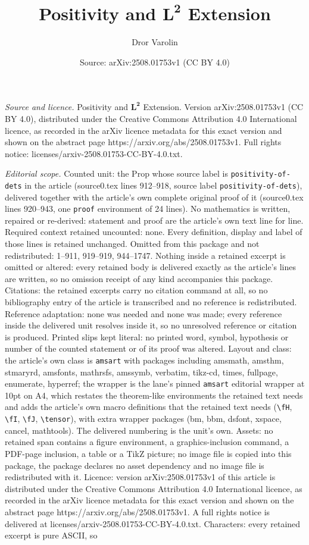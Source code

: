 \documentclass[10pt,a4paper]{amsart}
\title[Positivity and $\mathbf{L^2}$ Extension]{Positivity and $\mathbf{L^2}$ Extension}
\author{Dror Varolin}
\date{Source: arXiv:2508.01753v1 (CC BY 4.0)}
\begin{document}
\maketitle

\noindent\emph{Source and licence.} Positivity and $\mathbf{L^2}$ Extension. Version arXiv:2508.01753v1 (CC BY 4.0), distributed under the Creative Commons Attribution 4.0 International licence, as recorded in the arXiv licence metadata for this exact version and shown on the abstract page https://arxiv.org/abs/2508.01753v1. Full rights notice: licenses/arxiv-2508.01753-CC-BY-4.0.txt.\par\smallskip

\noindent\textit{Editorial scope.} Counted unit: the Prop whose source label is \texttt{positivity-of-dets} in the article (source0.tex lines 912--918, source label \texttt{positivity-of-dets}), delivered together with the article's own complete original proof of it (source0.tex lines 920--943, one \texttt{proof} environment of 24 lines). No mathematics is written, repaired or re-derived: statement and proof are the article's own text line for line. Required context retained uncounted: none. Every definition, display and label of those lines is retained unchanged. Omitted from this package and not redistributed: 1--911, 919--919, 944--1747. Nothing inside a retained excerpt is omitted or altered: every retained body is delivered exactly as the article's lines are written, so no omission receipt of any kind accompanies this package. Citations: the retained excerpts carry no citation command at all, so no bibliography entry of the article is transcribed and no reference is redistributed. Reference adaptation: none was needed and none was made; every reference inside the delivered unit resolves inside it, so no unresolved reference or citation is produced. Printed slips kept literal: no printed word, symbol, hypothesis or number of the counted statement or of its proof was altered. Layout and class: the article's own class is \texttt{amsart} with packages including amsmath, amsthm, stmaryrd, amsfonts, mathrsfs, amssymb, verbatim, tikz-cd, times, fullpage, enumerate, hyperref; the wrapper is the lane's pinned \texttt{amsart} editorial wrapper at 10pt on A4, which restates the theorem-like environments the retained text needs and adds the article's own macro definitions that the retained text needs (\texttt{\textbackslash fH}, \texttt{\textbackslash fI}, \texttt{\textbackslash fJ}, \texttt{\textbackslash tensor}), with extra wrapper packages (bm, bbm, dsfont, xspace, cancel, mathtools). The delivered numbering is the unit's own. Assets: no retained span contains a figure environment, a graphics-inclusion command, a PDF-page inclusion, a table or a TikZ picture; no image file is copied into this package, the package declares no asset dependency and no image file is redistributed with it. Licence: version arXiv:2508.01753v1 of this article is distributed under the Creative Commons Attribution 4.0 International licence, as recorded in the arXiv licence metadata for this exact version and shown on the abstract page https://arxiv.org/abs/2508.01753v1. A full rights notice is delivered at licenses/arxiv-2508.01753-CC-BY-4.0.txt. Characters: every retained excerpt is pure ASCII, so 
\end{document}
